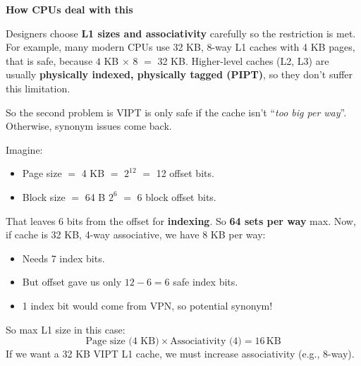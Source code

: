 \highspace
\begin{flushleft}
    \textcolor{Green3}{ \textbf{How CPUs deal with this}}
\end{flushleft}
Designers choose \textbf{L1 sizes and associativity} carefully so the restriction is met. For example, many modern CPUs use 32 KB, 8-way L1 caches with 4 KB pages, that is safe, because $4$ KB $\times$ 8 $=$ 32 KB. Higher-level caches (L2, L3) are usually \textbf{physically indexed, physically tagged (PIPT)}, so they don't suffer this limitation.

\highspace
So the second problem is VIPT is only safe if the cache isn't ``\emph{too big per way}''. Otherwise, synonym issues come back.

\highspace
\begin{examplebox}
    Imagine:
    \begin{itemize}
        \item Page size $=$ 4 KB $=$ $2^{12}$ $=$ 12 offset bits.
        \item Block size $=$ 64 B $2^6$ $=$ 6 block offset bits.
    \end{itemize}
    That leaves 6 bits from the offset for \textbf{indexing}. So \textbf{64 sets per way} max. Now, if cache is 32 KB, 4-way associative, we have 8 KB per way:
    \begin{itemize}
        \item Needs 7 index bits.
        \item But offset gave us only $12 - 6 = 6$ safe index bits.
        \item[\textcolor{Red2}{\faIcon{exclamation-triangle}}] 1 index bit would come from VPN, so potential synonym!
    \end{itemize}
    So max L1 size in this case:
    \begin{equation*}
        \text{Page size (4 KB)} \times \text{Associativity (4)} = 16\, \text{KB}
    \end{equation*}
    If we want a 32 KB VIPT L1 cache, we must increase associativity (e.g., 8-way).
\end{examplebox}

